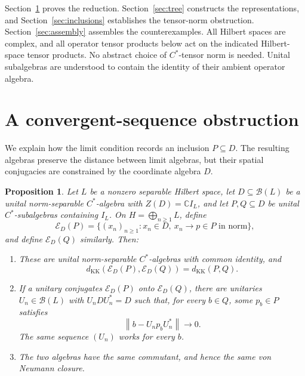 \documentclass[11pt]{article}
\newtheorem{proposition}[theorem]{Proposition}
\theoremstyle{definition}
\theoremstyle{remark}
\newcommand{\C}{\mathbb C}
\newcommand{\B}{\mathcal B}
\newcommand{\E}{\mathcal E}
\newcommand{\KK}{d_{\mathrm{KK}}}
\newcommand{\id}{I}
\newcommand{\norm}[1]{\left\|#1\right\|}
\begin{document}
Section~\ref{sec:sequences} proves the reduction.
Section~\ref{sec:tree} constructs the representations, and
Section~\ref{sec:inclusions} establishes the tensor-norm obstruction.
Section~\ref{sec:assembly} assembles the counterexamples.
All Hilbert spaces are complex, and all operator tensor products below act
on the indicated Hilbert-space tensor products. No abstract choice of
$C^*$-tensor norm is needed. Unital subalgebras are understood to contain
the identity of their ambient operator algebra.

\section{A convergent-sequence obstruction}\label{sec:sequences}

We explain how the limit condition records an inclusion $P\subseteq D$.
The resulting algebras preserve the distance between limit algebras, but
their spatial conjugacies are constrained by the coordinate algebra $D$.

\begin{proposition}\label{prop:sequences}
Let $L$ be a nonzero separable Hilbert space, let $D\subseteq\B(L)$ be a
unital norm-separable $C^*$-algebra with $Z(D)=\C\id_L$, and let
$P,Q\subseteq D$ be unital $C^*$-subalgebras containing $\id_L$.
On $H=\bigoplus_{n\ge1}L$, define
\begin{equation}\label{eq:sequence-definition}
\E_D(P)=\{(x_n)_{n\ge1}:x_n\in D,\ x_n\to p\in P\text{ in norm}\},
\end{equation}
and define $\E_D(Q)$ similarly. Then:
\begin{enumerate}
\item These are unital norm-separable $C^*$-algebras with common identity,
and
\begin{equation}\label{eq:distance-equality}
\KK(\E_D(P),\E_D(Q))=\KK(P,Q).
\end{equation}
\item If a unitary conjugates $\E_D(P)$ onto $\E_D(Q)$, there are unitaries
$U_n\in\B(L)$ with $U_nDU_n^*=D$ such that, for every $b\in Q$, some
$p_b\in P$ satisfies
\begin{equation}\label{eq:pointwise-normalizers}
\norm{b-U_np_bU_n^*}\longrightarrow0.
\end{equation}
The same sequence $(U_n)$ works for every $b$.
\item The two algebras have the same commutant, and hence the same
von Neumann closure.
\end{enumerate}
\end{proposition}
\end{document}
